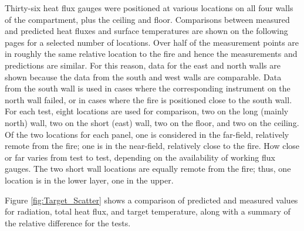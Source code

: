 Thirty-six heat flux gauges were positioned at various locations on all four walls of the compartment,
plus the ceiling and floor.  Comparisons between measured and predicted heat fluxes and surface temperatures are shown
on the following pages for a selected number of locations.
Over half of the measurement points are in roughly the same relative location to the fire and hence
the measurements and predictions are similar.  For this reason, data for the east and north walls are shown
because the data from the south and west walls are comparable.  Data from the south wall is used in cases where
the corresponding instrument on the north wall failed, or in cases where the fire is positioned close to the south wall.
For each test, eight locations are used for comparison, two on the long (mainly north) wall,
two on the short (east) wall, two on the floor, and two on the ceiling.  Of the two locations for each panel,
one is considered in the far-field, relatively remote from the fire; one is in the near-field,
relatively close to the fire.  How close or far varies from test to test, depending on the availability of working flux gauges.
The two short wall locations are equally remote from the fire; thus, one location is in the lower layer, one in the upper.

Figure \ref{fig:Target_Scatter} shows a comparison of predicted and measured values for radiation, total heat flux, and target temperature, along with a summary of the relative difference for the tests.

